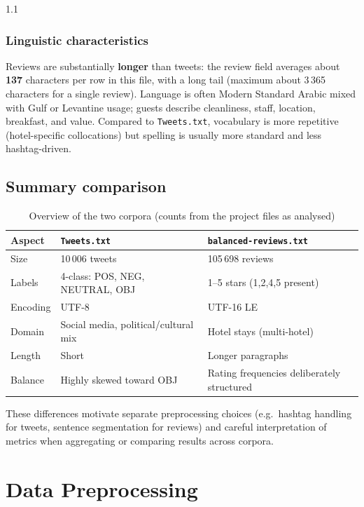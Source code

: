 \documentclass[11pt,a4paper]{report}
\begin{document}
\begin{spacing}{1.1}
\subsection{Linguistic characteristics}
Reviews are substantially \textbf{longer} than tweets: the review field averages about \textbf{137} characters per row in this file, with a long tail (maximum about 3\,365 characters for a single review). Language is often Modern Standard Arabic mixed with Gulf or Levantine usage; guests describe cleanliness, staff, location, breakfast, and value. Compared to \texttt{Tweets.txt}, vocabulary is more repetitive (hotel-specific collocations) but spelling is usually more standard and less hashtag-driven.

\section{Summary comparison}

\begin{table}[htbp]
    \centering
    \caption{Overview of the two corpora (counts from the project files as analysed)}
    \begin{tabular}{@{}p{3.2cm}p{4.5cm}p{5.8cm}@{}}
        \toprule
        \textbf{Aspect} & \textbf{\texttt{Tweets.txt}} & \textbf{\texttt{balanced-reviews.txt}} \\
        \midrule
        Size & 10\,006 tweets & 105\,698 reviews \\
        Labels & 4-class: POS, NEG, NEUTRAL, OBJ & 1--5 stars (1,2,4,5 present) \\
        Encoding & UTF-8 & UTF-16 LE \\
        Domain & Social media, political/cultural mix & Hotel stays (multi-hotel) \\
        Length & Short & Longer paragraphs \\
        Balance & Highly skewed toward OBJ & Rating frequencies deliberately structured \\
        \bottomrule
    \end{tabular}
\end{table}

\noindent
These differences motivate separate preprocessing choices (e.g.\ hashtag handling for tweets, sentence segmentation for reviews) and careful interpretation of metrics when aggregating or comparing results across corpora.

\end{spacing}

\chapter{Data Preprocessing}
\end{document}
